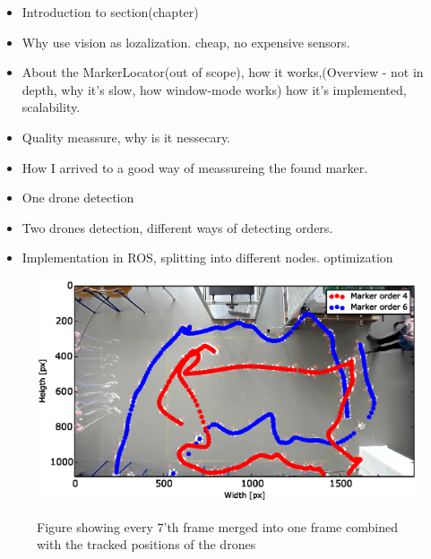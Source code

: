 \begin{itemize}
	\item Introduction to section(chapter)
	\item Why use vision as lozalization. cheap, no expensive sensors.
	\item About the MarkerLocator(out of scope), how it works,(Overview - not in depth, why it's slow, how window-mode works) how it's implemented, scalability.
	\item Quality meassure, why is it nessecary.
	\item How I arrived to a good way of meassureing the found marker.
	\item One drone detection
	\item Two drones detection, different ways of detecting orders.
	\item Implementation in ROS, splitting into different nodes.	optimization
\end{itemize}

\begin{figure}[!h]
    \center
    \includegraphics[width=1\textwidth]{graphics/test.eps}
  \label{fig:boat1}
  \caption{Figure showing every 7'th frame merged into one frame combined with the tracked positions of the drones}
\end{figure}

